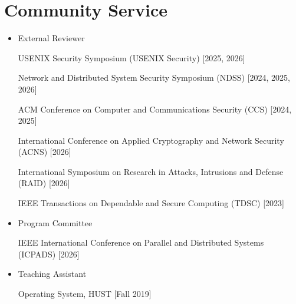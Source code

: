 \documentclass[letterpaper,10.8pt]{article}
\newcommand{\resumeItem}[2]{
  \item\small{
    \textbf{#1}{: #2 \vspace{-2pt}}
  }
}
\newcommand{\resumeSubItem}[2]{\resumeItem{#1}{#2}\vspace{-4pt}}
\newcommand{\resumeSubHeadingListStart}{\begin{itemize}[leftmargin=*]}
\newcommand{\resumeSubHeadingListEnd}{\end{itemize}}
\begin{document}
\vspace{-0.45cm}


%	




\section{Community Service}
\begin{itemize}[leftmargin=*]
    
    \item {External Reviewer}

    USENIX Security Symposium (USENIX Security) \hfill [2025, 2026]
    
    Network and Distributed System Security Symposium (NDSS) \hfill [2024, 2025, 2026]

    ACM Conference on Computer and Communications Security (CCS) \hfill [2024, 2025]

    International Conference on Applied Cryptography and Network Security (ACNS) \hfill [2026]

    International Symposium on Research in Attacks, Intrusions and Defense (RAID) \hfill [2026]
    
    IEEE Transactions on Dependable and Secure Computing (TDSC) \hfill [2023]

    \item {Program Committee}

    IEEE International Conference on Parallel and Distributed Systems (ICPADS) \hfill [2026]
    
    \item {Teaching Assistant}

    Operating System, HUST \hfill [Fall 2019]

\end{itemize}

\end{document}
